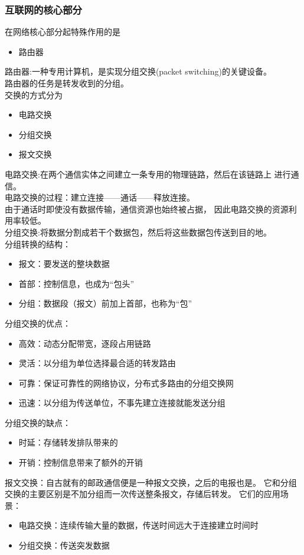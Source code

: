 \documentclass{ctexart}
\begin{document}
\subsubsection{互联网的核心部分}
在网络核心部分起特殊作用的是
\begin{itemize}
    \item 路由器
\end{itemize}
路由器:一种专用计算机，是实现分组交换(packet switching)的关键设备。\\
路由器的任务是转发收到的分组。\\
交换的方式分为
\begin{itemize}
    \item 电路交换
    \item 分组交换
    \item 报文交换
\end{itemize}
电路交换:在两个通信实体之间建立一条专用的物理链路，然后在该链路上
进行通信。\\
电路交换的过程：建立连接——通话——释放连接。\\
由于通话时即使没有数据传输，通信资源也始终被占据，
因此电路交换的资源利用率较低。\\
分组交换:将数据分割成若干个数据包，然后将这些数据包传送到目的地。\\
分组转换的结构：
\begin{itemize}
    \item 报文：要发送的整块数据
    \item 首部：控制信息，也成为“包头”
    \item 分组：数据段（报文）前加上首部，也称为“包”
\end{itemize}
分组交换的优点：
\begin{itemize}
    \item 高效：动态分配带宽，逐段占用链路
    \item 灵活：以分组为单位选择最合适的转发路由
    \item 可靠：保证可靠性的网络协议，分布式多路由的分组交换网
    \item 迅速：以分组为传送单位，不事先建立连接就能发送分组
\end{itemize}
分组交换的缺点：
\begin{itemize}
    \item 时延：存储转发排队带来的
    \item 开销：控制信息带来了额外的开销
\end{itemize}
报文交换：自古就有的邮政通信便是一种报文交换，之后的电报也是。
它和分组交换的主要区别是不加分组而一次传送整条报文，存储后转发。
它们的应用场景：
\begin{itemize}
    \item 电路交换：连续传输大量的数据，传送时间远大于连接建立时间时
    \item 分组交换：传送突发数据
\end{itemize}
\end{document}
